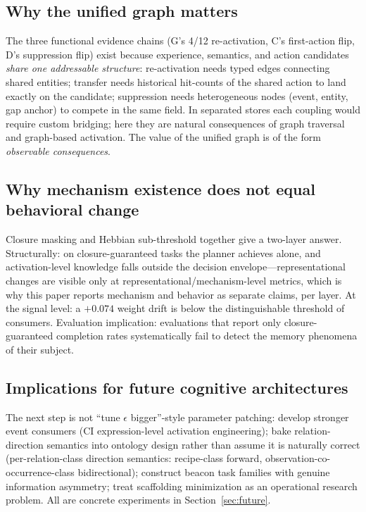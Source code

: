 \documentclass[10pt,a4paper]{article}
\begin{document}
\subsection{Why the unified graph matters}
The three functional evidence chains (G's 4/12 re-activation, C's first-action flip, D's suppression flip) exist because experience, semantics, and action candidates \emph{share one addressable structure}: re-activation needs typed edges connecting shared entities; transfer needs historical hit-counts of the shared action to land exactly on the candidate; suppression needs heterogeneous nodes (event, entity, gap anchor) to compete in the same field. In separated stores each coupling would require custom bridging; here they are natural consequences of graph traversal and graph-based activation. The value of the unified graph is of the form \emph{observable consequences}.

\subsection{Why mechanism existence does not equal behavioral change}
Closure masking and Hebbian sub-threshold together give a two-layer answer. Structurally: on closure-guaranteed tasks the planner achieves alone, and activation-level knowledge falls outside the decision envelope---representational changes are visible only at representational/mechanism-level metrics, which is why this paper reports mechanism and behavior as separate claims, per layer. At the signal level: a $+0.074$ weight drift is below the distinguishable threshold of consumers. Evaluation implication: evaluations that report only closure-guaranteed completion rates systematically fail to detect the memory phenomena of their subject.

\subsection{Implications for future cognitive architectures}
The next step is not ``tune $\epsilon$ bigger''-style parameter patching: develop stronger event consumers (CI expression-level activation engineering); bake relation-direction semantics into ontology design rather than assume it is naturally correct (per-relation-class direction semantics: recipe-class forward, observation-co-occurrence-class bidirectional); construct beacon task families with genuine information asymmetry; treat scaffolding minimization as an operational research problem. All are concrete experiments in Section~\ref{sec:future}.
\end{document}
